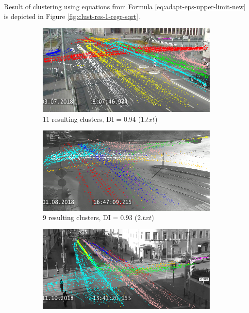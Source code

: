 Result of clustering using equations from Formula \ref{eq:adapt-eps-upper-limit-new} is depicted in Figure \ref{fig:clust-res-1-regr-sqrt}.

\begin{figure}[!htb]
	\centering
	\begin{subfigure}[!htb]{0.23\textwidth}
		\centering{}
		\includegraphics[width=\textwidth]{images/cl-res/clust-res-1-regr-sqrt-1.png}
		\caption{11 resulting clusters, DI = 0.94 ($1.txt$)}
		\label{fig:clust-res-1-regr-sqrt-1}
	\end{subfigure}
	\hfill
	\begin{subfigure}[!htb]{0.23\textwidth}
		\centering{}
		\includegraphics[width=\textwidth]{images/cl-res/clust-res-1-regr-sqrt-2.png}
		\caption{9 resulting clusters, DI = 0.93 ($2.txt$)}
		\label{fig:clust-res-1-regr-sqrt-2}
	\end{subfigure}
	\hfill
	\begin{subfigure}[!htb]{0.23\textwidth}
		\centering{}
		\includegraphics[width=\textwidth]{images/cl-res/clust-res-1-regr-sqrt-3.png}

\end{subfigure}
\end{figure}
